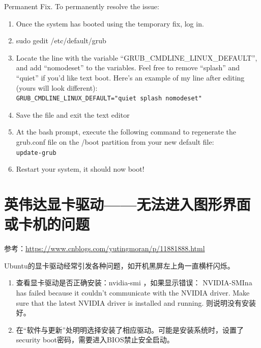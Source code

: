 Permanent Fix. To permanently resolve the issue:
\begin{enumerate}
\item Once the system has booted using the temporary fix, log in.

\item sudo gedit /etc/default/grub

\item Locate the line with the variable “GRUB\_CMDLINE\_LINUX\_DEFAULT”, and add “nomodeset” to the variables. Feel free to remove “splash” and “quiet” if you’d like text boot. Here’s an example of my line after editing (yours will look different):\\
\verb|GRUB_CMDLINE_LINUX_DEFAULT="quiet splash nomodeset"|

\item Save the file and exit the text editor 

\item At the bash prompt, execute the following command to regenerate the grub.conf file on the /boot partition from your new default file:\\
\verb|update-grub|

\item Restart your system, it should now boot!
\end{enumerate}




\section{英伟达显卡驱动——无法进入图形界面或卡机的问题}
参考：\url{https://www.cnblogs.com/yutingmoran/p/11881888.html}

Ubuntu的显卡驱动经常引发各种问题，如开机黑屏左上角一直横杆闪烁。

\begin{enumerate}
\item 查看显卡驱动是否正确安装：nvidia-smi ，如果显示错误：
NVIDIA-SMIna has failed because it couldn't communicate with the NVIDIA driver. Make sure that the latest NVIDIA driver is installed and running. 则说明没有安装好。

\item 在“软件与更新”处明明选择安装了相应驱动。可能是安装系统时，设置了security boot密码，需要进入BIOS禁止安全启动。
\end{enumerate}

